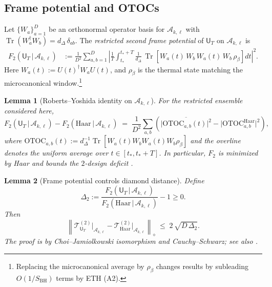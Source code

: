 \documentclass[a4paper,11pt]{article}
\let\mathscr\mathcal
\newcommand{\Tr}{\operatorname{Tr}}
\theoremstyle{plain}
\newtheorem{lemma}{Lemma}
\theoremstyle{definition}
\theoremstyle{remark}
\begin{document}
\subsection*{Frame potential and OTOCs}
Let $\{W_a\}_{a=1}^{D}$ be an orthonormal operator basis for $\mathscr{A}_{k,\ell}$ with $\Tr(W_a^\dagger W_b)=d_\Delta\,\delta_{ab}$.  The {\em restricted second frame potential} of $\mathsf{U}_T$ on $\mathscr{A}_{k,\ell}$ is
\begin{equation}
  \begin{aligned}
  F_2(\mathsf{U}_T \,|\, \mathscr{A}_{k,\ell})
  &:= \frac{1}{D^2} \sum_{a,b=1}^{D}
   \left| \frac{1}{T}\int_{t_\ast}^{t_\ast+T} \frac{1}{d_\Delta}\,
   \Tr\!\left[ W_a(t) \, W_b \, W_a(t) \, W_b \, \rho_\beta \right] dt \right|^2 .
  \end{aligned}
\end{equation}
Here $W_a(t):=U(t)^\dagger W_a U(t)$, and $\rho_\beta$ is the thermal state matching the microcanonical window.\footnote{Replacing the microcanonical average by $\rho_\beta$ changes results by subleading $O(1/S_{\mathrm{BH}})$ terms by ETH (A2).}

\begin{lemma}[Roberts--Yoshida identity on $\mathscr{A}_{k,\ell}$]\label{lem:RY}
For the restricted ensemble considered here,
\begin{equation}
  F_2(\mathsf{U}_T \,|\, \mathscr{A}_{k,\ell}) - F_2(\mathrm{Haar} \,|\, \mathscr{A}_{k,\ell})
  \;=\; \frac{1}{D^2}\sum_{a,b}\left( \overline{\big| \mathrm{OTOC}_{a,b}(t)\big|^2} - \big| \mathrm{OTOC}^{\mathrm{Haar}}_{a,b} \big|^2 \right),
\end{equation}
where $\mathrm{OTOC}_{a,b}(t):= d_\Delta^{-1}\Tr\!\left[ W_a(t) W_b W_a(t) W_b \rho_\beta \right]$ and the overline denotes the uniform average over $t\in[t_\ast,t_\ast+T]$.  In particular, $F_2$ is minimized by Haar and bounds the $2$-design deficit \cite{RobertsYoshida2017}.
\end{lemma}

\begin{lemma}[Frame potential controls diamond distance]\label{lem:FP-diamond}
Define
\[
\Delta_2:=\frac{F_2(\mathsf{U}_T \,|\, \mathscr{A}_{k,\ell})}{F_2(\mathrm{Haar} \,|\, \mathscr{A}_{k,\ell})}-1\ge 0.
\]
Then
\begin{equation}
 \left\| \mathcal{T}^{(2)}_{\mathsf{U}_T}\big|_{\mathscr{A}_{k,\ell}} - \mathcal{T}^{(2)}_{\mathrm{Haar}}\big|_{\mathscr{A}_{k,\ell}} \right\|_{\diamond}
 \;\le\; 2\, \sqrt{ D \, \Delta_2 }.
\end{equation}
The proof is by Choi--Jamiolkowski isomorphism and Cauchy--Schwarz; see also \cite{RobertsYoshida2017,BrandaoHarrowHorodecki2016}.
\end{lemma}
\end{document}
